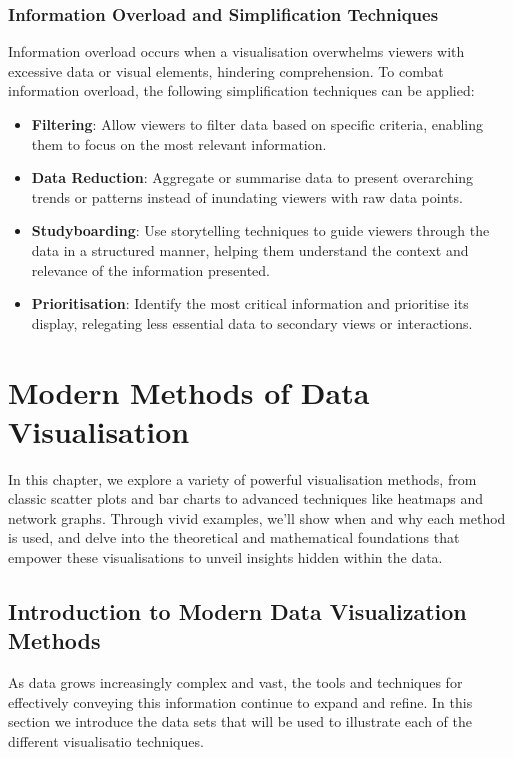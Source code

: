 \documentclass{article}\usepackage[]{graphicx}\usepackage[]{xcolor}
\begin{document}
\subsubsection{Information Overload and Simplification Techniques}
Information overload occurs when a visualisation overwhelms viewers with excessive data or visual elements, hindering comprehension. To combat information overload, the following simplification techniques can be applied:
\begin{itemize}
    \item \textbf{Filtering}: Allow viewers to filter data based on specific criteria, enabling them to focus on the most relevant information.
    \item \textbf{Data Reduction}:  Aggregate or summarise data to present overarching trends or patterns instead of inundating viewers with raw data points.
    \item \textbf{Studyboarding}: Use storytelling techniques to guide viewers through the data in a structured manner, helping them understand the context and relevance of the information presented.
    \item \textbf{Prioritisation}: Identify the most critical information and prioritise its display, relegating less essential data to secondary views or interactions.
\end{itemize}

\newpage

\section{Modern Methods of Data Visualisation}
In this chapter, we explore a variety of powerful visualisation methods, from classic scatter plots and bar charts to advanced techniques like heatmaps and network graphs. Through vivid examples, we'll show when and why each method is used, and delve into the theoretical and mathematical foundations that empower these visualisations to unveil insights hidden within the data.

\subsection{Introduction to Modern Data Visualization Methods}
As data grows increasingly complex and vast, the tools and techniques for effectively conveying this information continue to expand and refine. In this section we introduce the data sets that will be used to illustrate each of the different visualisatio techniques. 
\end{document}

